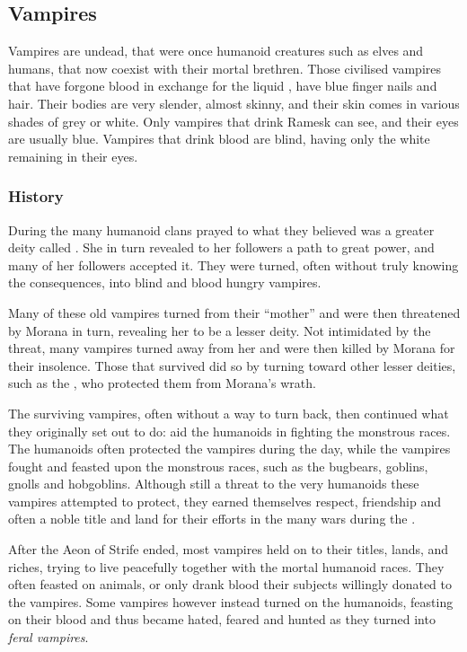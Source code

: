 \subsection{Vampires}
\label{sec:Vampires}

Vampires are undead, that were once humanoid creatures such as elves and
humans, that now coexist with their mortal brethren. Those civilised vampires
that have forgone blood in exchange for the liquid , have
blue finger nails and hair. Their bodies are very slender, almost skinny, and
their skin comes in various shades of grey or white. Only vampires that drink
Ramesk can see, and their eyes are usually blue. Vampires that drink blood are
blind, having only the white remaining in their eyes.

\subsubsection{History}

During the  many humanoid clans prayed to what
they believed was a greater deity called . She in turn
revealed to her followers a path to great power, and many of her followers
accepted it. They were turned, often without truly knowing the consequences,
into blind and blood hungry vampires.

Many of these old vampires turned from their ``mother'' and were then
threatened by Morana in turn, revealing her to be a lesser deity. Not
intimidated by the threat, many vampires turned away from her and were then
killed by Morana for their insolence. Those that survived did so by turning
toward other lesser deities, such as the , who
protected them from Morana's wrath.

The surviving vampires, often without a way to turn back, then continued
what they originally set out to do: aid the humanoids in fighting the
monstrous races. The humanoids often protected the vampires during the day,
while the vampires fought and feasted upon the monstrous races, such as the
bugbears, goblins, gnolls and hobgoblins. Although still a threat to the very
humanoids these vampires attempted to protect, they earned themselves respect,
friendship and often a noble title and land for their efforts in the many wars
during the .

After the Aeon of Strife ended, most vampires held on to their titles, lands,
and riches, trying to live peacefully together with the mortal humanoid races.
They often feasted on animals, or only drank blood their subjects willingly
donated to the vampires. Some vampires however instead turned on the humanoids,
feasting on their blood and thus became hated, feared and hunted as they turned
into \emph{feral vampires}.

